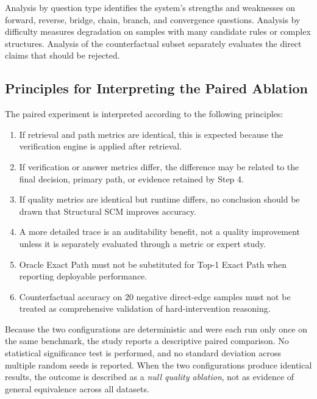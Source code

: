 Analysis by question type identifies the system's strengths and weaknesses on
forward, reverse, bridge, chain, branch, and convergence questions. Analysis
by difficulty measures degradation on samples with many candidate rules or
complex structures. Analysis of the counterfactual subset separately evaluates
the direct claims that should be rejected.

\subsection{Principles for Interpreting the Paired Ablation}

The paired experiment is interpreted according to the following principles:

\begin{enumerate}
    \item If retrieval and path metrics are identical, this is expected because
    the verification engine is applied after retrieval.

    \item If verification or answer metrics differ, the difference may be
    related to the final decision, primary path, or evidence retained by Step
    4.

    \item If quality metrics are identical but runtime differs, no conclusion
    should be drawn that Structural SCM improves accuracy.

    \item A more detailed trace is an auditability benefit, not a quality
    improvement unless it is separately evaluated through a metric or expert
    study.

    \item Oracle Exact Path must not be substituted for Top-1 Exact Path when
    reporting deployable performance.

    \item Counterfactual accuracy on \(20\) negative direct-edge samples must
    not be treated as comprehensive validation of hard-intervention reasoning.
\end{enumerate}

Because the two configurations are deterministic and were each run only once
on the same benchmark, the study reports a descriptive paired comparison. No
statistical significance test is performed, and no standard deviation across
multiple random seeds is reported. When the two configurations produce
identical results, the outcome is described as a \emph{null quality
ablation}, not as evidence of general equivalence across all datasets.
